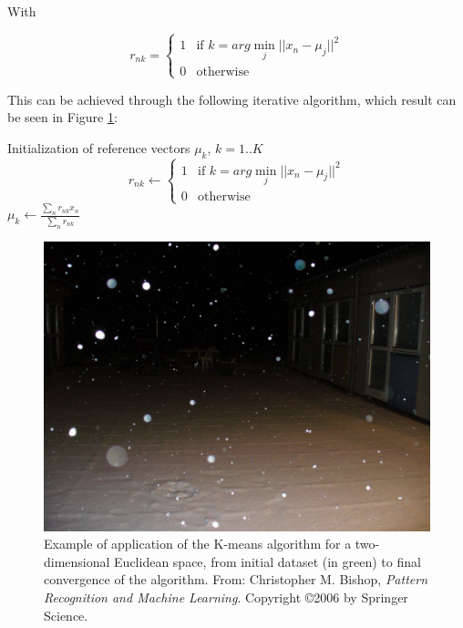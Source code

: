 \noindent With

\begin{equation*}
r_{nk} = \left\{
	\begin{array}{ll}
		1 & \mbox{if }  k = arg \min_j ||x_n - \mu_j||^2 \\
		0 & \mbox{otherwise}
	\end{array}
\right.
\end{equation*}
\vspace{\baselineskip}

\noindent This can be achieved through the following iterative algorithm, which result can be seen in Figure \ref{k-mean_res}:
\newline

\begin{algorithmic}
\State Initialization of reference vectors $\mu_k$, $k = 1..K$ 
\Repeat	
		\State \begin{equation*} 
				r_{nk} \gets \left\{
				\begin{array}{ll}
					1 & \mbox{if }  k = arg \min_j ||x_n - \mu_j||^2 \\
					0 & \mbox{otherwise}
				\end{array}
				\right.
				\end{equation*}
	\EndFor
		\State $\mu_k \gets \frac{\sum\limits_n r_{nk}x_n}{\sum\limits_n r_{nk}}$
	\EndFor
{}
\end{algorithmic}

\vspace{\baselineskip}

\begin{figure}[!h]
\begin{center}
\noindent \includegraphics[scale=0.1]{figures/k-mean_res} 
\newline
\caption{Example of application of the K-means algorithm for a two-dimensional Euclidean space, from initial dataset (in green) to final convergence of the algorithm. From: Christopher M. Bishop, \textit{Pattern Recognition and Machine Learning}. Copyright \copyright  2006 by Springer Science.}
\label{k-mean_res}
\end{center} 
\end{figure}

